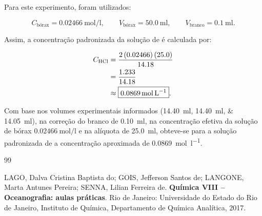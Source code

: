 \documentclass[a4paper,12pt]{article}
\begin{document}
Para este experimento, foram utilizados:

\begin{equation*}
  C_{\text{bórax}}=\qty{0.02466}{\mole\per\litre},
  \qquad
  V_{\text{bórax}}=\qty{50.0}{\milli\litre},
  \qquad
  V_{\text{branco}}=\qty{0.1}{\milli\litre}.
\end{equation*}

Assim, a concentração padronizada da solução de  é calculada por:

\begin{align*}
  C_{\ce{HCl}}
    &=\frac{2\,(0.02466)\,(25.0)}{14.18} \\
    &=\frac{1.233}{14.18} \\
    &\approx \boxed{\qty{0.0869}{\mole\per\litre}}.
\end{align*}

\begin{tcolorbox}[
  title=Resultado da padronização,
  colback=quadrocinza,
  colframe=black!65,
  boxrule=0.6pt,
  arc=1mm
]
Com base nos volumes experimentais informados (\qtylist{14.40;14.40;14.05}{\milli\litre}), na correção do branco de \qty{0.10}{\milli\litre}, na concentração efetiva da solução de bórax \(\qty{0.02466}{\mole\per\litre}\) e na alíquota de \qty{25.0}{\milli\litre}, obteve-se para a solução padronizada de  a concentração aproximada de \qty{0.0869}{\mole\per\litre}.
\end{tcolorbox}

\newpage
{}
{}
\begin{thebibliography}{99}

LAGO, Dalva Cristina Baptista do;
GOIS, Jefferson Santos de;
LANGONE, Marta Antunes Pereira;
SENNA, Lilian Ferreira de.
\textbf{Química VIII -- Oceanografia: aulas práticas}.
Rio de Janeiro: Universidade do Estado do Rio de Janeiro, Instituto de Química, Departamento de Química Analítica, 2017.

\end{thebibliography}
\end{document}
